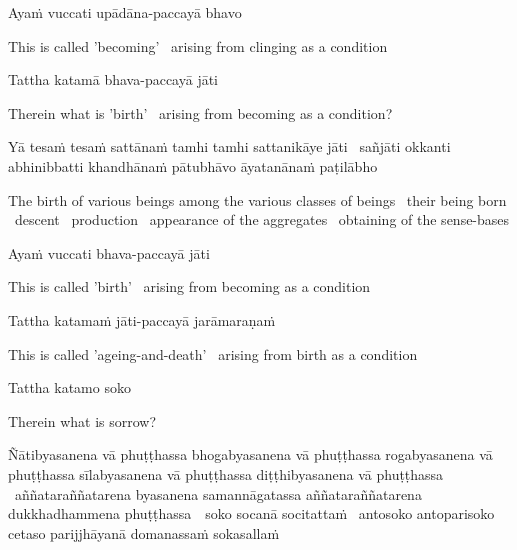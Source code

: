 Ayaṁ vuccati upādāna-paccayā bhavo

\begin{english}
  This is called 'becoming' \breathmark\ arising from clinging as a condition
\end{english}

Tattha katamā bhava-paccayā jāti

\begin{english}
  Therein what is 'birth' \breathmark\ arising from becoming as a condition?
\end{english}

\begin{pali-hang}
  Yā tesaṁ tesaṁ sattānaṁ tamhi tamhi sattanikāye jāti \breathmark\ sañjāti okkanti abhinibbatti khandhānaṁ pātubhāvo āyatanānaṁ paṭilābho\makeatletter\hyperlink{endnote83-appendix}\makeatother
\end{pali-hang}

\begin{english-hang-verses}
  The birth of various beings among the various classes of beings \breathmark\ their being born \breathmark\ descent \breathmark\ production \breathmark\ appearance of the aggregates \breathmark\ obtaining of the sense-bases
\end{english-hang-verses}

Ayaṁ vuccati bhava-paccayā jāti

\begin{english}
  This is called 'birth' \breathmark\ arising from becoming as a condition
\end{english}

Tattha katamaṁ jāti-paccayā jarāmaraṇaṁ

\begin{english}
  This is called 'ageing-and-death' \breathmark\ arising from birth as a condition
\end{english}

Tattha katamo soko

\begin{english}
  Therein what is sorrow?
\end{english}

\begin{pali-hang}
  Ñātibyasanena vā phuṭṭhassa bhogabyasanena vā phuṭṭhassa rogabyasanena vā phuṭṭhassa sīlabyasanena vā phuṭṭhassa diṭṭhibyasanena vā phuṭṭhassa \breathmark\ aññataraññatarena byasanena samannāgatassa aññataraññatarena dukkhadhammena \mbox{phuṭṭhassa}~\breathmark\ soko socanā socitattaṁ \breathmark\ antosoko antoparisoko cetaso parijjhāyanā domanassaṁ sokasallaṁ
\end{pali-hang}

